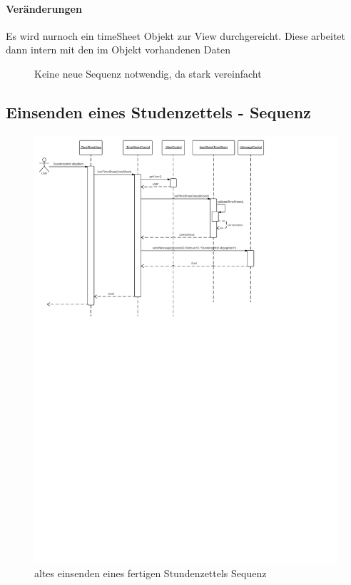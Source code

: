             \paragraph{Veränderungen}
                Es wird nurnoch ein timeSheet Objekt zur View durchgereicht.
                Diese arbeitet dann intern mit den im Objekt vorhandenen Daten
            \begin{figure}
              \centering
               \caption{Keine neue Sequenz notwendig, da stark vereinfacht}
            \end{figure}

        \subsection{Einsenden eines Studenzettels - Sequenz}
                    \begin{figure}
                      \centering
                        \includegraphics[width=\linewidth]{send-in-timesheet.pdf}
                       \caption{altes einsenden eines fertigen Stundenzettels  Sequenz}
                    \end{figure}


